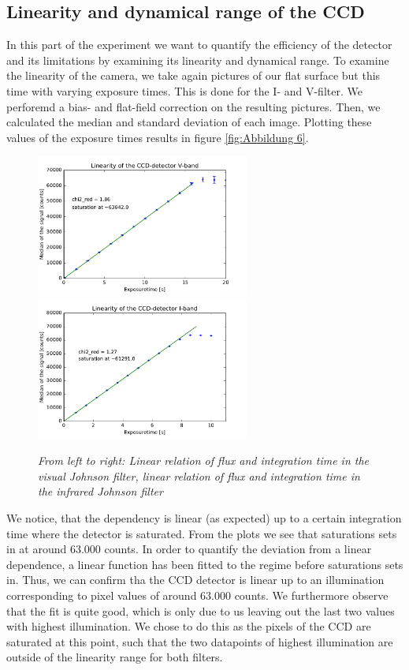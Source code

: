 \subsection{Linearity and dynamical range of the CCD}
In this part of the experiment we want to quantify the efficiency of the detector and its limitations by examining its linearity and dynamical range. To examine the linearity of the camera, we take again pictures of our flat surface but this time with varying exposure times. This is done for the I- and V-filter. We perforemd a bias- and flat-field correction on the resulting pictures. Then, we calculated the median and standard deviation of each image. Plotting these values of the exposure times results in figure \ref{fig:Abbildung 6}.
\begin{figure}[h]
	\includegraphics[width=70mm]{liniarity_V}
	\includegraphics[width=70mm]{liniarity_I}
	\centering
	\caption{ \itshape From left to right: Linear relation of flux and integration time in the visual Johnson filter, linear relation of flux and integration time in the infrared Johnson filter  }
	\label{fig:Abbildung 5}


\end{figure}
\noindent
We notice, that the dependency is linear (as expected) up to a certain integration time where the detector is saturated. From the plots we see that saturations sets in at around $63.000$ counts.  In order to quantify the deviation from a linear dependence, a linear function has been fitted to the regime before saturations sets in. Thus, we can confirm tha the CCD detector is linear up to an illumination corresponding to pixel values of around $63.000$ counts. We furthermore observe that the fit is quite good, which is only due to us leaving out the last two values with highest illumination. We chose to do this as the pixels of the CCD are saturated at this point, such that the two datapoints of highest illumination are outside of the linearity range for both filters.


